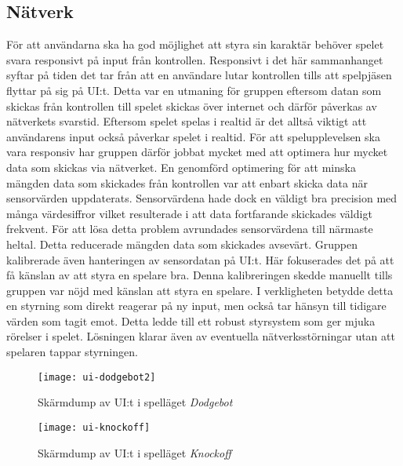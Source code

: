\subsection{Nätverk}
För att användarna ska ha god möjlighet att styra sin karaktär behöver spelet svara responsivt på input från kontrollen. Responsivt i det här sammanhanget syftar på tiden det tar från att en användare lutar kontrollen tills att spelpjäsen flyttar på sig på UI:t. Detta var en utmaning för gruppen eftersom datan som skickas från kontrollen till spelet skickas över internet och därför påverkas av nätverkets svarstid. Eftersom spelet spelas i realtid är det alltså viktigt att användarens input också påverkar spelet i realtid. För att spelupplevelsen ska vara responsiv har gruppen därför jobbat mycket med att optimera hur mycket data som skickas via nätverket. En genomförd optimering för att minska mängden data som skickades från kontrollen var att enbart skicka data när sensorvärden uppdaterats. Sensorvärdena hade dock en väldigt bra precision med många värdesiffror vilket resulterade i att data fortfarande skickades väldigt frekvent. För att lösa detta problem avrundades sensorvärdena till närmaste heltal. Detta reducerade mängden data som skickades avsevärt. Gruppen kalibrerade även hanteringen av sensordatan på UI:t. Här fokuserades det på att få känslan av att styra en spelare bra. Denna kalibreringen skedde manuellt tills gruppen var nöjd med känslan att styra en spelare. I verkligheten betydde detta en styrning som direkt reagerar på ny input, men också tar hänsyn till tidigare värden som tagit emot. Detta ledde till ett robust styrsystem som ger mjuka rörelser i spelet. Lösningen klarar även av eventuella nätverksstörningar utan att spelaren tappar styrningen.

\begin{figure}[h]
    \centering
    \texttt{[image: ui-dodgebot2]}
    \caption{Skärmdump av UI:t i spelläget \textit{Dodgebot}}
    \label{fig:ui-dodgebot}
\end{figure}

\begin{figure}[h]
    \centering
    \texttt{[image: ui-knockoff]}
    \caption{Skärmdump av UI:t i spelläget \textit{Knockoff}}
    \label{fig:ui-knockoff}
\end{figure}
